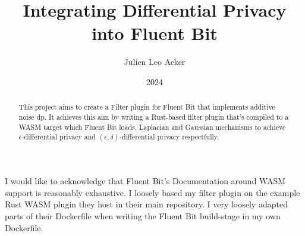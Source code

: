

\title{Integrating Differential Privacy into Fluent Bit}
\author{Julien Leo Acker}

    
\date{2024}



\maketitle
\makedeclaration

\begin{abstract}
This project aims to create a Filter plugin for Fluent Bit that implements additive noise \acrlong{dp}. It achieves this aim by writing a Rust-based filter plugin that's compiled to a WASM target which Fluent Bit loads. Laplacian and Gaussian mechanisms to achieve $\epsilon$-differential privacy and $(\epsilon,\delta)$-differential privacy respectfully.
\end{abstract}

\begin{acknowledgements}
I would like to acknowledge that Fluent Bit's Documentation around WASM support is reasonably exhaustive. I loosely based my filter plugin on the example Rust WASM plugin they host in their main repository. I very loosely adapted parts of their Dockerfile when writing the Fluent Bit build-stage in my own Dockerfile.

\end{acknowledgements}

\def\sfthing#1#2{\def#1{\mbox{{\small\normalfont\sffamily #2}}}}

\sfthing{\PP}{P}
\sfthing{\FF}{F}

\printglossary[type=\acronymtype]
\tableofcontents







% 

\appendix






